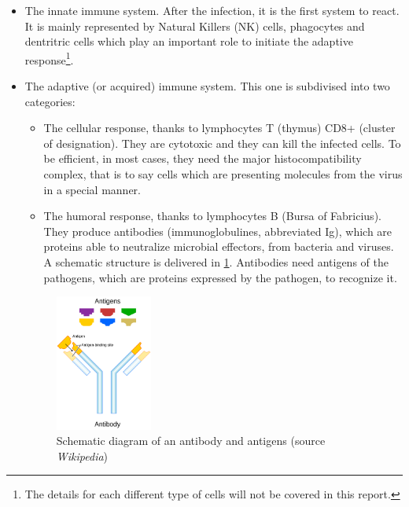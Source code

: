 \documentclass{article}
\begin{document}
                \begin{itemize}
                    \item The innate immune system. After the infection, it is the first system to react. It is mainly represented by Natural Killers (NK) cells,
                            phagocytes and dentritric cells which play an important role to initiate the adaptive response\footnote{The details for each different type 
                                of cells will not be covered in this report.}.
                    \item The adaptive (or acquired) immune system. This one is subdivised into two categories: 
                        \begin{itemize}
                            \item The cellular response, thanks to lymphocytes T (thymus) CD8+ (cluster of designation). They are cytotoxic and they can kill the infected cells.
                                    To be efficient, in most cases, they need the major histocompatibility complex, 
                                    that is to say cells which are presenting molecules from the virus in a special manner.
                            \item The humoral response, thanks to lymphocytes B (Bursa of Fabricius). They produce antibodies (immunoglobulines, abbreviated Ig),
                                    which are proteins able to 
                                    neutralize microbial effectors, from bacteria and viruses. 
                                    A schematic structure is delivered in \ref{fig:antigens}.
                                    Antibodies need antigens of the pathogens, which are proteins expressed by the pathogen, to recognize it.
                        \end{itemize}

                        \begin{figure}
                            \centering
                            \includegraphics[width=0.3\textwidth]{imgs/Antigen.png}
                            \caption{Schematic diagram of an antibody and antigens (source \emph{Wikipedia})}
                            \label{fig:antigens}
                        \end{figure}


\end{itemize}
\end{document}

